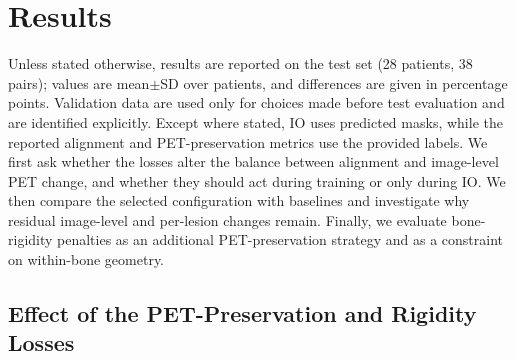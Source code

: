 \section{Results}
\label{sect:results}

Unless stated otherwise, results are reported on the test set (28 patients, 38 pairs); values are mean$\pm$SD over patients, and differences are given in percentage points.
Validation data are used only for choices made before test evaluation and are identified explicitly.
Except where stated, IO uses predicted masks, while the reported alignment and PET-preservation metrics use the provided labels.
We first ask whether the losses alter the balance between alignment and image-level PET change, and whether they should act during training or only during IO.
We then compare the selected configuration with baselines and investigate why residual image-level and per-lesion changes remain.
Finally, we evaluate bone-rigidity penalties as an additional PET-preservation strategy and as a constraint on within-bone geometry.

\subsection{Effect of the PET-Preservation and Rigidity Losses}
\label{sect:res_q1}

